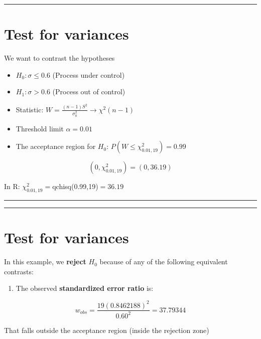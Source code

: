 \documentclass[
]{book}
\providecommand{\tightlist}{%
  \setlength{\itemsep}{0pt}\setlength{\parskip}{0pt}}
\begin{document}
\begin{center}\rule{0.5\linewidth}{0.5pt}\end{center}

\hypertarget{test-for-variances-4}{%
\section{Test for variances}\label{test-for-variances-4}}

We want to contrast the hypotheses

\begin{itemize}
\item
  \(H_0:\sigma \leq 0.6\) (Process under control)
\item
  \(H_1:\sigma > 0.6\) (Process out of control)
\item
  Statistic: \(W=\frac{(n-1)S^2}{\sigma_0^2} \rightarrow \chi^2(n-1)\)
\item
  Threshold limit \(\alpha=0.01\)
\item
  The acceptance region for \(H_0\): \(P(W\leq \chi^2_{0.01,19})=0.99\)
\end{itemize}

\[(0, \chi^2_{0.01,19})=(0,36.19)\]

In R: \(\chi^2_{0.01,19}=\)qchisq(0.99,19)\(= 36.19\)

\begin{center}\rule{0.5\linewidth}{0.5pt}\end{center}

\begin{center}\rule{0.5\linewidth}{0.5pt}\end{center}

\hypertarget{test-for-variances-5}{%
\section{Test for variances}\label{test-for-variances-5}}

In this example, we \textbf{reject} \(H_0\) because of any of the following equivalent contrasts:

\begin{enumerate}
\def\labelenumi{\arabic{enumi}.}
\tightlist
\item
  The observed \textbf{standardized error ratio} is:
\end{enumerate}

\[w_{obs}=\frac{19 (0.8462188)^2}{0.60^2}=37.79344\]

That falls outside the acceptance region (inside the rejection zone)
\end{document}
